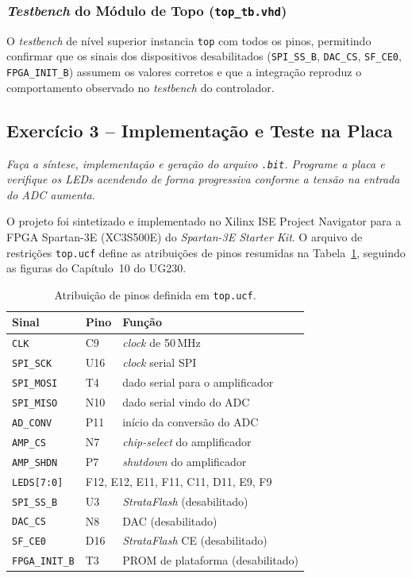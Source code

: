 \documentclass[12pt,a4paper]{article}
\newcommand{\question}[1]{
    \vspace{0.8em}
    \noindent\textit{#1}
    \vspace{0.4em}
}
\newcommand{\answer}{
    \par
}
\begin{document}
\subsubsection{\textit{Testbench} do Módulo de Topo (\texttt{top\_tb.vhd})}

O \textit{testbench} de nível superior instancia \texttt{top} com todos os pinos, permitindo
confirmar que os sinais dos dispositivos desabilitados (\texttt{SPI\_SS\_B},
\texttt{DAC\_CS}, \texttt{SF\_CE0}, \texttt{FPGA\_INIT\_B}) assumem os valores corretos e que
a integração reproduz o comportamento observado no \textit{testbench} do controlador.

\subsection{Exercício 3 – Implementação e Teste na Placa}

\question{Faça a síntese, implementação e geração do arquivo \texttt{.bit}. Programe a placa
e verifique os LEDs acendendo de forma progressiva conforme a tensão na entrada do ADC
aumenta.}

\answer
O projeto foi sintetizado e implementado no Xilinx ISE Project Navigator para a FPGA
Spartan-3E (XC3S500E) do \textit{Spartan-3E Starter Kit}. O arquivo de restrições
\texttt{top.ucf} define as atribuições de pinos resumidas na Tabela~\ref{tab:pinos},
seguindo as figuras do Capítulo~10 do UG230.

\begin{table}[H]
\centering
\begin{tabular}{lll}
\hline
\textbf{Sinal} & \textbf{Pino} & \textbf{Função} \\
\hline
\texttt{CLK}        & C9  & \textit{clock} de 50\,MHz \\
\texttt{SPI\_SCK}   & U16 & \textit{clock} serial SPI \\
\texttt{SPI\_MOSI}  & T4  & dado serial para o amplificador \\
\texttt{SPI\_MISO}  & N10 & dado serial vindo do ADC \\
\texttt{AD\_CONV}   & P11 & início da conversão do ADC \\
\texttt{AMP\_CS}    & N7  & \textit{chip-select} do amplificador \\
\texttt{AMP\_SHDN}  & P7  & \textit{shutdown} do amplificador \\
\texttt{LEDS[7:0]}  & \multicolumn{2}{l}{F12, E12, E11, F11, C11, D11, E9, F9} \\
\texttt{SPI\_SS\_B} & U3  & \textit{StrataFlash} (desabilitado) \\
\texttt{DAC\_CS}    & N8  & DAC (desabilitado) \\
\texttt{SF\_CE0}    & D16 & \textit{StrataFlash} CE (desabilitado) \\
\texttt{FPGA\_INIT\_B} & T3 & PROM de plataforma (desabilitado) \\
\hline
\end{tabular}
\caption{Atribuição de pinos definida em \texttt{top.ucf}.}
\label{tab:pinos}
\end{table}
\end{document}
